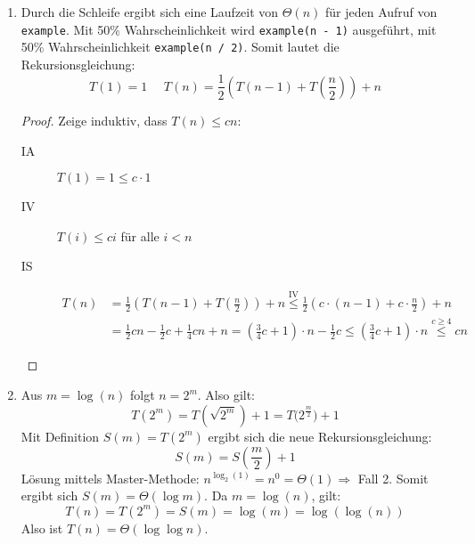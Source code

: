\documentclass[11pt,a4paper]{article}
\begin{document}
\begin{loesung}
\begin{enumerate}
    \item
    Durch die Schleife ergibt sich eine Laufzeit von $\Theta(n)$ für jeden Aufruf von \texttt{example}.
    Mit 50\% Wahrscheinlichkeit wird \texttt{example(n - 1)} ausgeführt, mit 50\% Wahrscheinlichkeit \texttt{example(n / 2)}.
    Somit lautet die Rekursionsgleichung:
    \begin{equation*}
        T(1) = 1 \,\,\,\,\,\,\,\, T(n) = \frac{1}{2}\left(T(n - 1) + T\left(\frac{n}{2}\right)\right) + n
    \end{equation*}
    \begin{proof}
        Zeige induktiv, dass $T(n) \leq cn$:
        \begin{description}
            \item[IA] $T(1) = 1 \leq c \cdot 1$
            \item[IV] $T(i) \leq ci$ für alle $i < n$
            \item[IS]
            \begin{align*}
                T(n) &= \frac{1}{2}\left(T(n - 1) + T\left(\frac{n}{2}\right)\right) + n
                \overset{\text{IV}}{\leq} \frac{1}{2}\left(c \cdot (n - 1) + c \cdot \frac{n}{2} \right) + n \\
                &=\frac{1}{2} cn - \frac{1}{2} c + \frac{1}{4} cn + n
                = \left(\frac{3}{4} c + 1\right) \cdot n - \frac{1}{2} c
                \leq \left(\frac{3}{4} c + 1\right) \cdot n
                \overset{c \geq 4}{\leq} cn
            \end{align*} 
        \end{description}
    \end{proof}
    \item 
    Aus $m = \log(n)$ folgt $n = 2^m$. Also gilt:
    \begin{equation*}
        T(2^m) = T\left(\sqrt{2^{m}}\right) + 1 = T\big(2^{\frac{m}{2}}\big) + 1
    \end{equation*}
    Mit Definition $S(m) = T(2^m)$ ergibt sich die neue Rekursionsgleichung:
    \begin{equation*}
        S(m) = S\left(\frac{m}{2}\right) + 1
    \end{equation*}
    Lösung mittels Master-Methode: $n^{\log_2(1)} = n^0 = \Theta(1) \Rightarrow$ Fall 2.
    Somit ergibt sich $S(m) = \Theta(\log m)$.
    Da $m = \log(n)$, gilt:
    \begin{equation*}
        T(n) = T(2^m) = S(m) = \log(m) = \log(\log(n))
    \end{equation*}
    Also ist $T(n) = \Theta(\log \log n)$.
\end{enumerate}
\end{loesung}
\end{document}
